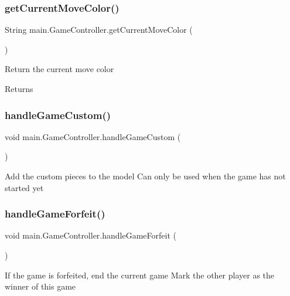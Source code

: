 \subsubsection{\texorpdfstring{get\+Current\+Move\+Color()}{getCurrentMoveColor()}}
{\footnotesize\ttfamily String main.\+Game\+Controller.\+get\+Current\+Move\+Color (\begin{DoxyParamCaption}{ }\end{DoxyParamCaption})}

Return the current move color \begin{DoxyReturn}{Returns}

\end{DoxyReturn}
\hypertarget{classmain_1_1_game_controller_ae75c41f7d73fe335be348d54a8e8c4e6}{}\label{classmain_1_1_game_controller_ae75c41f7d73fe335be348d54a8e8c4e6} 
\subsubsection{\texorpdfstring{handle\+Game\+Custom()}{handleGameCustom()}}
{\footnotesize\ttfamily void main.\+Game\+Controller.\+handle\+Game\+Custom (\begin{DoxyParamCaption}{ }\end{DoxyParamCaption})}

Add the custom pieces to the model Can only be used when the game has not started yet \hypertarget{classmain_1_1_game_controller_a864236ccf74601951d818826253123d4}{}\label{classmain_1_1_game_controller_a864236ccf74601951d818826253123d4} 
\subsubsection{\texorpdfstring{handle\+Game\+Forfeit()}{handleGameForfeit()}}
{\footnotesize\ttfamily void main.\+Game\+Controller.\+handle\+Game\+Forfeit (\begin{DoxyParamCaption}{ }\end{DoxyParamCaption})}

If the game is forfeited, end the current game Mark the other player as the winner of this game \hypertarget{classmain_1_1_game_controller_a8291acf4ec3e1dc1cabdcb2a23c70e16}{}\label{classmain_1_1_game_controller_a8291acf4ec3e1dc1cabdcb2a23c70e16} 
